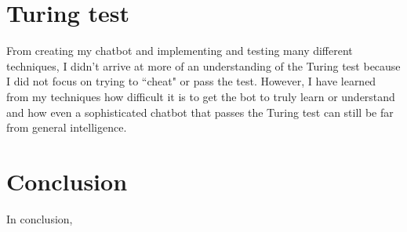 \documentclass{article}
\newcommand{\n}[0]{\\[\baselineskip]}
\begin{document}
\section{Turing test}
From creating my chatbot and implementing and testing many different techniques, I didn't arrive at more of an understanding of the Turing test because I did not focus on trying to ``cheat" or pass the test. However, I have learned from my techniques how difficult it is to get the bot to truly learn or understand and how even a sophisticated chatbot that passes the Turing test can still be far from general intelligence.
\n

\section{Conclusion}
In conclusion, 
\printbibliography
\end{document}
